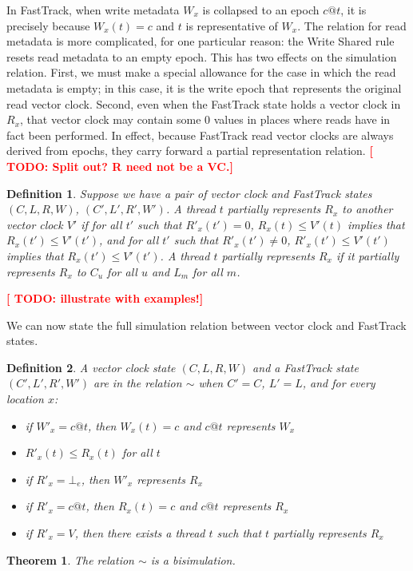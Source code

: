 \documentclass[preprint, 10pt]{sigplanconf}
\newcommand{\TODO}[1]{\textbf{\textcolor{red}{[ TODO: #1]}}}
\newtheorem{theorem}{Theorem}
\newtheorem{definition}{Definition}
\begin{document}
In FastTrack, when write metadata $W_x$ is collapsed to an epoch $c@t$, it is precisely because $W_x(t) = c$ and $t$ is representative of $W_x$. The relation for read metadata is more complicated, for one particular reason: the Write Shared rule resets read metadata to an empty epoch. This has two effects on the simulation relation. First, we must make a special allowance for the case in which the read metadata is empty; in this case, it is the write epoch that represents the original read vector clock. Second, even when the FastTrack state holds a vector clock in $R_x$, that vector clock may contain some 0 values in places where reads have in fact been performed. In effect, because FastTrack read vector clocks are always derived from epochs, they carry forward a partial representation relation. \TODO{Split out? R need not be a VC.}
\begin{definition}Suppose we have a pair of vector clock and FastTrack states $(C, L, R, W)$, $(C', L', R', W')$. A thread $t$ \emph{partially represents} $R_x$ to another vector clock $V'$ if for all $t'$ such that $R'_x(t') = 0$, $R_x(t) \le V'(t)$ implies that $R_x(t') \le V'(t')$, and for all $t'$ such that $R'_x(t') \neq 0$, $R'_x(t') \le V'(t')$ implies that $R_x(t') \le V'(t')$. A thread $t$ partially represents $R_x$ if it partially represents $R_x$ to $C_u$ for all $u$ and $L_m$ for all $m$.\end{definition}
\TODO{illustrate with examples!}

We can now state the full simulation relation between vector clock and FastTrack states.
\begin{definition}A vector clock state $(C, L, R, W)$ and a FastTrack state $(C', L', R', W')$ are in the relation $\sim$ when $C' = C$, $L' = L$, and for every location $x$:
\begin{itemize}
\item if $W'_x = c@t$, then $W_x(t) = c$ and $c@t$ represents $W_x$
\item $R'_x(t) \le R_x(t)$ for all $t$
\item if $R'_x = \bot_e$, then $W'_x$ represents $R_x$
\item if $R'_x = c@t$, then $R_x(t) = c$ and $c@t$ represents $R_x$
\item if $R'_x = V$, then there exists a thread $t$ such that $t$ partially represents $R_x$
\end{itemize}
\end{definition}
\begin{theorem}The relation $\sim$ is a bisimulation.\end{theorem}
\end{document}

